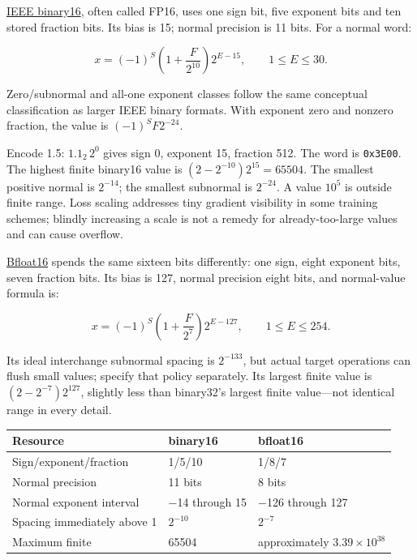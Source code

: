 \hyperref[appendix-34443cec7170]{IEEE binary16}, often called FP16, uses one sign bit, five exponent bits and ten stored fraction bits. Its bias is 15; normal precision is 11 bits. For a normal word:

\[
x=(-1)^S\left(1+\frac{F}{2^{10}}\right)2^{E-15},
\qquad 1\le E\le30.
\]

Zero/subnormal and all-one exponent classes follow the same conceptual classification as larger IEEE binary formats. With exponent zero and nonzero fraction, the value is \((-1)^SF2^{-24}\).

Encode 1.5: \(1.1_2\,2^0\) gives sign 0, exponent 15, fraction 512. The word is \texttt{0x3E00}. The highest finite binary16 value is \((2-2^{-10})2^{15}=65504\). The smallest positive normal is \(2^{-14}\); the smallest subnormal is \(2^{-24}\). A value \(10^5\) is outside finite range. Loss scaling addresses tiny gradient visibility in some training schemes; blindly increasing a scale is not a remedy for already-too-large values and can cause overflow.

\hyperref[appendix-18b8dd966b5d]{Bfloat16} spends the same sixteen bits differently: one sign, eight exponent bits, seven fraction bits. Its bias is 127, normal precision eight bits, and normal-value formula is:

\[
x=(-1)^S\left(1+\frac{F}{2^7}\right)2^{E-127},
\qquad1\le E\le254.
\]

Its ideal interchange subnormal spacing is \(2^{-133}\), but actual target operations can flush small values; specify that policy separately. Its largest finite value is \((2-2^{-7})2^{127}\), slightly less than binary32's largest finite value---not identical range in every detail.

{\def\LTcaptype{none} %
\begin{longtable}[]{@{}lll@{}}
\toprule\noalign{}
Resource & binary16 & bfloat16 \\
\midrule\noalign{}
\endhead
\bottomrule\noalign{}
\endlastfoot
Sign/exponent/fraction & 1/5/10 & 1/8/7 \\
Normal precision & 11 bits & 8 bits \\
Normal exponent interval & −14 through 15 & −126 through 127 \\
Spacing immediately above 1 & \(2^{-10}\) & \(2^{-7}\) \\
Maximum finite & 65504 & approximately \(3.39\times10^{38}\) \\
\end{longtable}
}

